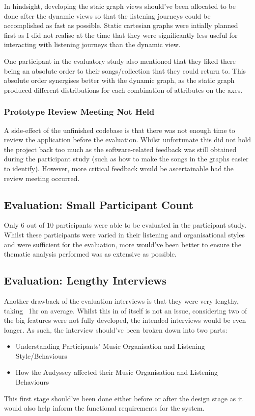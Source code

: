 In hindsight, developing the staic graph views should've been allocated to be done after the dynamic views so that the listening journeys could be accomplished as fast as possible. Static cartesian graphs were intially planned first as I did not realise at the time that they were significantly less useful for interacting with listening journeys than the dynamic view.

One participant in the evaluatory study also mentioned that they liked there being an absolute order to their songs/collection that they could return to. This absolute order synergises better with the dynamic graph, as the static graph produced different distributions for each combination of attributes on the axes.

\subsubsection{Prototype Review Meeting Not Held}
A side-effect of the unfinished codebase is that there was not enough time to review the application before the evaluation. Whilst unfortunate this did not hold the project back too much as the software-related feedback was still obtained during the participant study (such as how to make the songs in the graphs easier to identify). However, more critical feedback would be ascertainable had the review meeting occurred.

\subsection{Evaluation: Small Participant Count}
Only 6 out of 10 participants were able to be evaluated in the participant study. Whilst these participants were varied in their listening and organisational styles and were sufficient for the evaluation, more would've been better to ensure the thematic analysis performed was as extensive as possible.

\subsection{Evaluation: Lengthy Interviews} %
Another drawback of the evaluation interviews is that they were very lengthy, taking ~1hr on average. Whilst this in of itself is not an issue, considering two of the big features were not fully developed, the intended interviews would be even longer. As such, the interview should've been broken down into two parts:\begin{itemize}
    \item Understanding Participants' Music Organisation and Listening Style/Behaviours
    \item How the Audyssey affected their Music Organisation and Listening Behaviours
\end{itemize}
This first stage should've been done either before or after the design stage as it would also help inform the functional requirements for the system.

